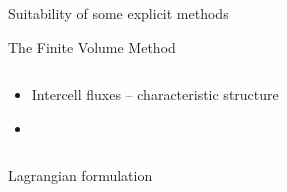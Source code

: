 \begin{withoutheadline}
\begin{frame}{Suitability of some explicit methods}
\begin{block}{The Finite Volume Method \cite{Leveque}}
\begin{overprint}
\begin{columns}
\begin{footnotesize}
\begin{column}{0.6\textwidth}
              \begin{itemize}
              \item[] Intercell fluxes -- characteristic structure \cite{Godunov_method}
              \item[] %
              \end{itemize}
            \end{column}
          \end{footnotesize}
        \end{columns}
        \vskip -10pt
        \begin{columns}
          \begin{column}{0.48\textwidth}
            \begin{block}{\footnotesize Lagrangian formulation \cite{Haider_FVM}} %
              \centering
            \end{block}
          \end{column}
          \begin{column}{0.48\textwidth}
            
          \end{column}
        \end{columns}
        \vspace{-0.2cm}
      \end{overprint}
    \end{block}
  \end{frame}
\end{withoutheadline}


